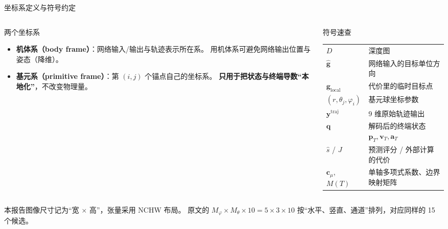 \begin{frame}{坐标系定义与符号约定}
  \small
  \begin{columns}[t]
    \begin{column}{0.5\textwidth}
      \begin{block}{两个坐标系}
        \begin{itemize}\tight
          \item \textbf{机体系（body frame）}：网络输入/输出与轨迹表示所在系。
                用机体系可避免网络输出位置与姿态（降维）。
          \item \textbf{基元系（primitive frame）}：第 $(i,j)$ 个锚点自己的坐标系。
                \textbf{只用于把状态与终端导数“本地化”}，不改变物理量。
        \end{itemize}
      \end{block}
    \end{column}
    \begin{column}{0.46\textwidth}
      \begin{block}{符号速查}
        \scriptsize
        \begin{tabular}{@{}ll@{}}
          \toprule
          $D$ & 深度图 \\
          $\hat{\mathbf g}$ & 网络输入的目标单位方向 \\
          $\mathbf g_{\mathrm{local}}$ & 代价里的临时目标点 \\
          $(r,\theta_j,\varphi_i)$ & 基元球坐标参数 \\
          $\mathbf y^{\mathrm{traj}}$ & 9 维原始轨迹输出 \\
          $\mathbf q$ & 解码后的终端状态 $\mathbf p_T,\mathbf v_T,\mathbf a_T$ \\
          $\hat s$ / $J$ & 预测评分 / 外部计算的代价 \\
          $\mathbf c_\mu$, $M(T)$ & 单轴多项式系数、边界映射矩阵 \\
          \bottomrule
        \end{tabular}
      \end{block}
    \end{column}
  \end{columns}

  \begin{reading}[维度约定的统一]
    \small
    本报告图像尺寸记为“宽 $\times$ 高”，张量采用 NCHW 布局。
    原文的 $M_\varphi\times M_\theta\times 10=5\times3\times10$
    按“水平、竖直、通道”排列，对应同样的 15 个候选。
  \end{reading}
\end{frame}
